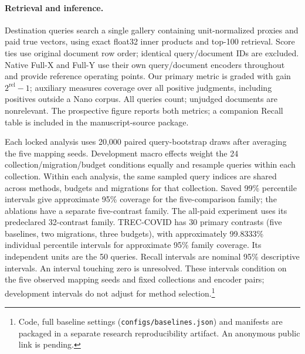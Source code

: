 \paragraph{Retrieval and inference.}
Destination queries search a single gallery containing unit-normalized
proxies and paid true vectors, using exact float32 inner products and
top-100 retrieval. Score ties use original document row order; identical
query/document IDs are excluded. Native Full-X and Full-Y use their own
query/document encoders throughout and provide reference operating points.
Our primary metric is graded \ndcg{} with gain $2^{\mathrm{rel}}-1$; auxiliary
\recall{} measures coverage over all
positive judgments, including positives outside a Nano corpus. All queries
count; unjudged documents are nonrelevant. The prospective figure reports both
metrics; a companion Recall table is included in the manuscript-source package.

Each locked analysis uses 20,000 paired query-bootstrap draws after
averaging the five mapping seeds. Development macro effects weight the
24 collection/migration/budget conditions equally and resample queries
within each collection. Within each analysis, the same sampled query indices
are shared across methods, budgets and migrations for that collection.
Saved 99\% percentile intervals give approximate
95\% coverage for the five-comparison family; the ablations have a separate
five-contrast family. The all-paid experiment uses its predeclared
32-contrast family. TREC-COVID has 30 primary contrasts
(five baselines, two migrations, three budgets), with approximately
99.8333\% individual percentile intervals for approximate 95\% family
coverage. Its independent units are the 50 queries. Recall intervals are
nominal 95\% descriptive intervals. An interval touching zero is unresolved.
These intervals condition on the five observed mapping seeds and fixed
collections and encoder pairs; development intervals do not adjust for
method selection.\footnote{Code, full baseline settings
(\texttt{configs/baselines.json}) and manifests are packaged in a separate
research reproducibility artifact. An anonymous public link is pending.}

